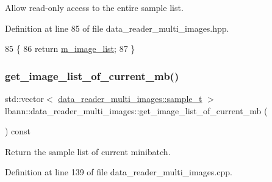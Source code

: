 Allow read-\/only access to the entire sample list. 



Definition at line 85 of file data\+\_\+reader\+\_\+multi\+\_\+images.\+hpp.


\begin{DoxyCode}
85                                                     \{
86     \textcolor{keywordflow}{return} \hyperlink{classlbann_1_1data__reader__multi__images_a6d8e2d161c9efff1ac70f847b4a7e9d0}{m\_image\_list};
87   \}
\end{DoxyCode}
\mbox{\label{classlbann_1_1data__reader__multi__images_a6328561103138b60f22dbd927186f7d2}} 
\subsubsection{\texorpdfstring{get\+\_\+image\+\_\+list\+\_\+of\+\_\+current\+\_\+mb()}{get\_image\_list\_of\_current\_mb()}}
{\footnotesize\ttfamily std\+::vector$<$ \hyperlink{classlbann_1_1data__reader__multi__images_a6cbb30001dd633b0d810c417cbbf441e}{data\+\_\+reader\+\_\+multi\+\_\+images\+::sample\+\_\+t} $>$ lbann\+::data\+\_\+reader\+\_\+multi\+\_\+images\+::get\+\_\+image\+\_\+list\+\_\+of\+\_\+current\+\_\+mb (\begin{DoxyParamCaption}{ }\end{DoxyParamCaption}) const}



Return the sample list of current minibatch. 



Definition at line 139 of file data\+\_\+reader\+\_\+multi\+\_\+images.\+cpp.


